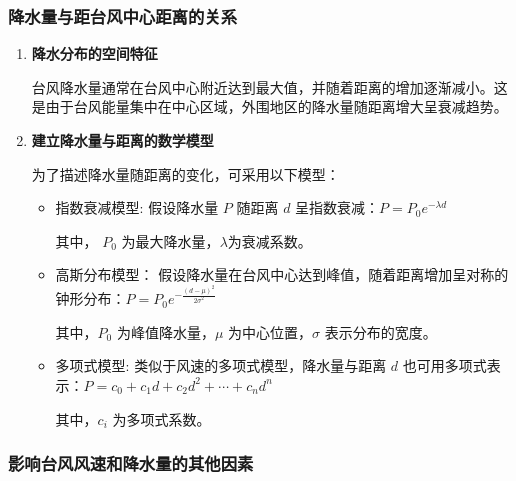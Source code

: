 \documentclass[withoutpreface,bwprint]{cumcmthesis}
\begin{document}
\subsubsection{降水量与距台风中心距离的关系}

\begin{enumerate}
    \item[(1)] \textbf{降水分布的空间特征}
               
               台风降水量通常在台风中心附近达到最大值，并随着距离的增加逐渐减小。这是由于台风能量集中在中心区域，外围地区的降水量随距离增大呈衰减趋势。

    \item[(2)] \textbf{建立降水量与距离的数学模型}
               
               为了描述降水量随距离的变化，可采用以下模型：

               \begin{itemize}
                   \item 指数衰减模型: 假设降水量 $P$ 随距离 $d$ 呈指数衰减：$P = P_0 e^{-\lambda d}$

                   其中， $P_0$ 为最大降水量，$\lambda$为衰减系数。

                   \item 高斯分布模型： 假设降水量在台风中心达到峰值，随着距离增加呈对称的钟形分布：$P = P_0 e^{-\frac{(d - \mu)^2}{2\sigma^2}}$

                   其中，$P_0$ 为峰值降水量，$\mu$ 为中心位置，$\sigma$ 表示分布的宽度。

                   \item 多项式模型: 类似于风速的多项式模型，降水量与距离 $d$ 也可用多项式表示：$P = c_0 + c_1 d + c_2 d^2 + \cdots + c_n d^n$

                   其中，$c_i$ 为多项式系数。
                   
               \end{itemize}

\end{enumerate}

\subsubsection{影响台风风速和降水量的其他因素}
\end{document}
